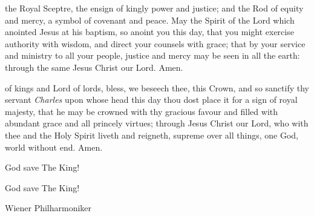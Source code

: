 {\clearpage






 the Royal Sceptre, the ensign of kingly power and justice; and the
Rod of equity and mercy, a symbol of covenant and peace.
May the Spirit of the Lord which anointed Jesus at his baptism, so anoint
you this day, that you might exercise authority with wisdom, and direct
your counsels with grace; that by your service and ministry to all your
people, justice and mercy may be seen in all the earth: through the same
Jesus Christ our Lord. Amen.
\vfill 
{}



 of kings and Lord of lords,
bless, we beseech thee, this Crown,
and so sanctify thy servant \textit{Charles}
upon whose head this day thou dost place it
for a sign of royal majesty,
that he may be crowned with thy gracious favour
and filled with abundant grace and all princely virtues;
through Jesus Christ our Lord,
who with thee and the Holy Spirit liveth and reigneth,
supreme over all things,
one God, world without end.
Amen.




God save The King!


God save The King!

\vfill  {Wiener Philharmoniker}






\clearpage

}
